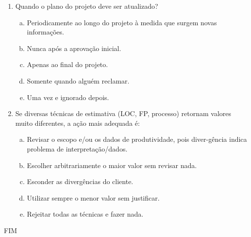 \documentclass{beamer}
\begin{document}
\begin{frame}
    \begin{enumerate}
        \justifying
        \setcounter{enumi}{34}
        \item<1-2> Quando o plano do projeto deve ser atualizado?
        \begin{enumerate}[a)]
            \justifying
            \item<1-2> \alert<2>{Periodicamente ao longo do projeto à medida que surgem novas informações}.
            \item<1-2> Nunca após a aprovação inicial.
            \item<1-2> Apenas ao final do projeto.
            \item<1-2> Somente quando alguém reclamar.
            \item<1-2> Uma vez e ignorado depois.
        \end{enumerate}
        \item<3-4> Se diversas técnicas de estimativa (LOC, FP, processo) retornam valores muito diferentes, a ação mais adequada é:
        \begin{enumerate}[a)]
            \justifying
            \item<3-4> \alert<4>{Revisar o escopo e/ou os dados de produtividade, pois diver-gência indica problema de interpretação/dados}.
            \item<3-4> Escolher arbitrariamente o maior valor sem revisar nada.
            \item<3-4> Esconder as divergências do cliente.
            \item<3-4> Utilizar sempre o menor valor sem justificar.
            \item<3-4> Rejeitar todas as técnicas e fazer nada.
        \end{enumerate}
    \end{enumerate}
\end{frame} 


\begin{frame}
    \centering
    \Large
    FIM
\end{frame}
    
\end{document}
